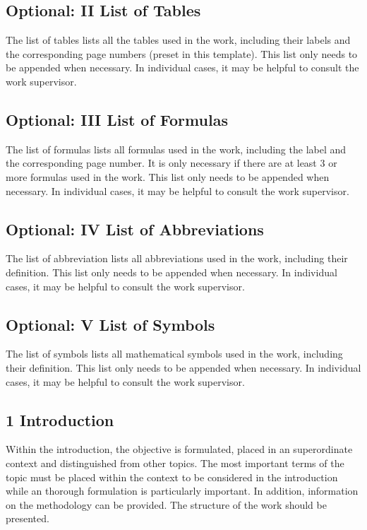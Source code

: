 \subsection*{Optional: II List of Tables}
The list of tables lists all the tables used in the work, including their labels and the corresponding page numbers (preset in this template). This list only needs to be appended when necessary. In individual cases, it may be helpful to consult the work supervisor.

\subsection*{Optional: III List of Formulas}
The list of formulas lists all formulas used in the work, including the label and the corresponding page number. It is only necessary if there are at least 3 or more formulas used in the work. This list only needs to be appended when necessary. In individual cases, it may be helpful to consult the work supervisor.

\subsection*{Optional: IV List of Abbreviations}
The list of abbreviation lists all abbreviations used in the work, including their definition. This list only needs to be appended when necessary. In individual cases, it may be helpful to consult the work supervisor.

\subsection*{Optional: V List of Symbols}
The list of symbols lists all mathematical symbols used in the work, including their definition. This list only needs to be appended when necessary. In individual cases, it may be helpful to consult the work supervisor.

\subsection*{1 Introduction}
Within the introduction, the objective is formulated, placed in an superordinate context and distinguished from other topics. The most important terms of the topic must be placed within the context to be considered in the introduction while an thorough formulation is particularly important. In addition, information on the methodology can be provided. The structure of the work should be presented. 

